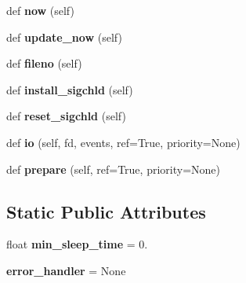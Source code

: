 \begin{DoxyCompactItemize}
\mbox{\label{classgevent_1_1libuv_1_1loop_1_1loop_a32d2dd4567f16e65e3f42782d6543bf3}} 
def {\bfseries now} (self)
\item 
\mbox{\label{classgevent_1_1libuv_1_1loop_1_1loop_a902734ea7ef0edda8c3b68f0d0a999d2}} 
def {\bfseries update\+\_\+now} (self)
\item 
\mbox{\label{classgevent_1_1libuv_1_1loop_1_1loop_ace7cb997f84ee7692f1f17957cb5f476}} 
def {\bfseries fileno} (self)
\item 
\mbox{\label{classgevent_1_1libuv_1_1loop_1_1loop_a2b5b2207364cb59c490cf9eb8b95ca93}} 
def {\bfseries install\+\_\+sigchld} (self)
\item 
\mbox{\label{classgevent_1_1libuv_1_1loop_1_1loop_a109386942c9079964db007290790f036}} 
def {\bfseries reset\+\_\+sigchld} (self)
\item 
\mbox{\label{classgevent_1_1libuv_1_1loop_1_1loop_afd69cf9dba2059050cd05cc6d0c29a80}} 
def {\bfseries io} (self, fd, events, ref=True, priority=None)
\item 
\mbox{\label{classgevent_1_1libuv_1_1loop_1_1loop_a5e1865c73f904049f38f6bcb6139783e}} 
def {\bfseries prepare} (self, ref=True, priority=None)
\end{DoxyCompactItemize}
\subsection*{Static Public Attributes}
\begin{DoxyCompactItemize}
\item 
\mbox{\label{classgevent_1_1libuv_1_1loop_1_1loop_a9dc27f5f0c4fb045a74c7dab4ca26107}} 
float {\bfseries min\+\_\+sleep\+\_\+time} = 0.
\item 
\mbox{\label{classgevent_1_1libuv_1_1loop_1_1loop_a0e6380d20716e5ece2f48636b0784046}} 
{\bfseries error\+\_\+handler} = None
\end{DoxyCompactItemize}
